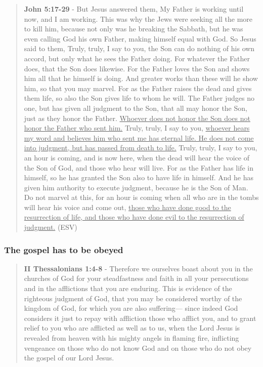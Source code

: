 \documentclass[11pt]{article}
\begin{document}
\begin{quote}
\textbf{John 5:17-29} - But Jesus answered them, My Father is working until now, and I am working. This was why the Jews were seeking all the more to kill him, because not only was he breaking the Sabbath, but he was even calling God his own Father, making himself equal with God. So Jesus said to them, Truly, truly, I say to you, the Son can do nothing of his own accord, but only what he sees the Father doing. For whatever the Father does, that the Son does likewise. For the Father loves the Son and shows him all that he himself is doing. And greater works than these will he show him, so that you may marvel. For as the Father raises the dead and gives them life, so also the Son gives life to whom he will. The Father judges no one, but has given all judgment to the Son, that all may honor the Son, just as they honor the Father. \uline{Whoever does not honor the Son does not honor the Father who sent him.} Truly, truly, I say to you, \uline{whoever hears my word and believes him who sent me has eternal life. He does not come into judgment, but has passed from death to life.} Truly, truly, I say to you, an hour is coming, and is now here, when the dead will hear the voice of the Son of God, and those who hear will live. For as the Father has life in himself, so he has granted the Son also to have life in himself. And he has given him authority to execute judgment, because he is the Son of Man. Do not marvel at this, for an hour is coming when all who are in the tombs will hear his voice and come out, \uline{those who have done good to the resurrection of life, and those who have done evil to the resurrection of judgment.} (ESV)
\end{quote}

\subsubsection{The gospel has to be obeyed}
\label{sec:orgc59bad8}
\begin{quote}
\textbf{II Thessalonians 1:4-8} - Therefore we ourselves boast about you in the churches of God for your steadfastness and faith in all your persecutions and in the afflictions that you are enduring. This is evidence of the righteous judgment of God, that you may be considered worthy of the kingdom of God, for which you are also suffering— since indeed God considers it just to repay with affliction those who afflict you, and to grant relief to you who are afflicted as well as to us, when the Lord Jesus is revealed from heaven with his mighty angels in flaming fire, inflicting vengeance on those who do not know God and on those who do not obey the gospel of our Lord Jesus.
\end{quote}
\end{document}
